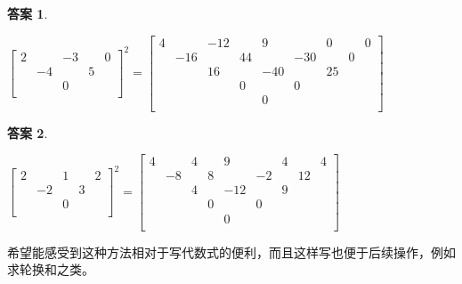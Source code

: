 \documentclass[UTF8]{ctexart}
\newtheorem{4}{答案}
\begin{document}
\begin{4}
	\begin{center}
		$ \left[\begin{matrix}
		2& &-3& &0\\
		&-4& &5&\\
		& &0& &\\
	\end{matrix}\right]^{2}=
	\left[\begin{matrix}
		4& &-12& &9& &0& &0\\
		&-16& &44& &-30& &0&\\
		& &16& &-40& &25& &\\
		& & &0& &0& & &\\
		& & & &0& & & &\\
	\end{matrix}\right] $
   \end{center}
\end{4}
\begin{4}
	\begin{center}
		$ \left[\begin{matrix}
			2& &1& &2\\
			&-2& &3&\\
			& &0& &\\
		\end{matrix}\right]^{2}=
		\left[\begin{matrix}
			4& &4& &9& &4& &4\\
			&-8& &8& &-2& &12&\\
			& &4& &-12& &9& &\\
			& & &0& &0& & &\\
			& & & &0& & & &\\
		\end{matrix}\right] $
	\end{center}
\end{4}
希望能感受到这种方法相对于写代数式的便利，而且这样写也便于后续操作，例如求轮换和之类。
\end{document}
